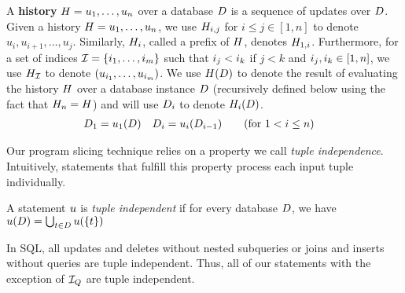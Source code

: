 A \textbf{history} $H = u_1, \ldots, u_n$ %
over a database $D$ is a sequence of updates over $D$. %
Given a history $H = u_1, \ldots,u_n$, we use $H_{i,j}$ for $i \leq j \in [1,n]$ to denote $u_i, u_{i+1}, \ldots, u_j$. Similarly, $H_{i}$, called a prefix of $H$, denotes $H_{1,i}$. Furthermore, for a set of indices $\mathcal{I} = \{ i_1, \ldots, i_m \}$ such that $i_j < i_k$ if $j < k$ and $i_j, i_k \in [1,n]$, we use $H_{\mathcal{I}}$ to denote $(u_{i_1}, \ldots, u_{i_m})$.
We use $H(D)$ to denote the result of evaluating the history $H$ over a database instance $D$ (recursively defined below using the fact that $H_{n} = H$) and will use $D_{i}$ to denote $H_{i}(D)$.
%
\begin{align*}
  D_1 &= u_1(D) &D_i &= u_i(D_{i-1}) \tag{for $1 < i \leq n$}
\end{align*}

Our program slicing technique relies on a property we call \emph{tuple independence}. Intuitively, statements that fulfill this property process each input tuple individually.

\begin{defi}\label{def:tuple-independence}
 A statement $u$ is \emph{tuple independent} if for every database $D$, we have $u(D) = \bigcup_{t \in D} u(\{t\})$
\end{defi}
In SQL, all updates and deletes without nested subqueries or joins and inserts without queries are tuple independent. Thus, all of our statements with the exception of $\mathcal{I}_{Q}$ are tuple independent.

